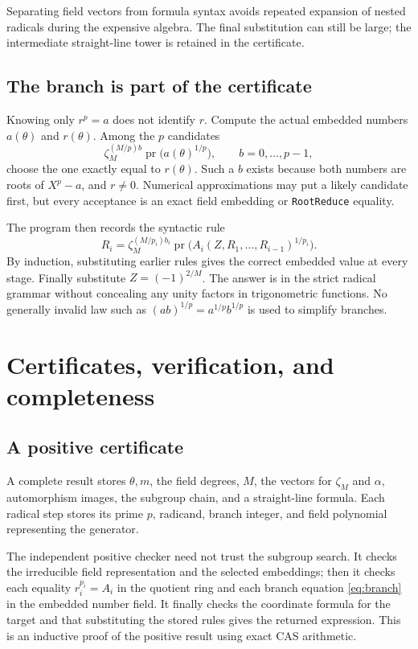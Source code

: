 \documentclass[11pt,letterpaper]{article}
\theoremstyle{definition}\newtheorem{definition}[theorem]{Definition}
\theoremstyle{remark}\newtheorem{remark}[theorem]{Remark}
\newcommand{\code}[1]{\texttt{#1}}
\newcommand{\pr}{\operatorname{pr}}
\begin{document}
Separating field vectors from formula syntax avoids repeated expansion of
nested radicals during the expensive algebra. The final substitution can
still be large; the intermediate straight-line tower is retained in the
certificate.

\subsection{The branch is part of the certificate}
Knowing only $r^p=a$ does not identify $r$. Compute the actual embedded
numbers $a(\theta)$ and $r(\theta)$. Among the $p$ candidates
\begin{equation}\label{eq:branch}
 \zeta_M^{(M/p)b}\pr\bigl(a(\theta)^{1/p}\bigr),
 \qquad b=0,\ldots,p-1,
\end{equation}
choose the one exactly equal to $r(\theta)$. Such a $b$ exists because
both numbers are roots of $X^p-a$, and $r\ne0$. Numerical approximations
may put a likely candidate first, but every acceptance is an exact field
embedding or \code{RootReduce} equality.

The program then records the syntactic rule
\[
 R_i=\zeta_M^{(M/p_i)b_i}
 \pr\bigl(A_i(Z,R_1,\ldots,R_{i-1})^{1/p_i}\bigr).
\]
By induction, substituting earlier rules gives the correct embedded value
at every stage. Finally substitute $Z=(-1)^{2/M}$. The answer is in the
strict radical grammar without concealing any unity factors in
trigonometric functions. No generally invalid law such as
$(ab)^{1/p}=a^{1/p}b^{1/p}$ is used to simplify branches.

\section{Certificates, verification, and completeness}
\label{sec:correctness}
\subsection{A positive certificate}
A complete result stores $\theta,m$, the field degrees, $M$, the vectors for
$\zeta_M$ and $\alpha$, automorphism images, the subgroup chain, and a
straight-line formula. Each radical step stores its prime $p$, radicand,
branch integer, and field polynomial representing the generator.

The independent positive checker need not trust the subgroup search. It
checks the irreducible field representation and the selected embeddings;
then it checks each equality $r_i^{p_i}=A_i$ in the quotient ring and each
branch equation \eqref{eq:branch} in the embedded number field. It finally
checks the coordinate formula for the target and that substituting the
stored rules gives the returned expression. This is an inductive proof of
the positive result using exact CAS arithmetic.
\end{document}
